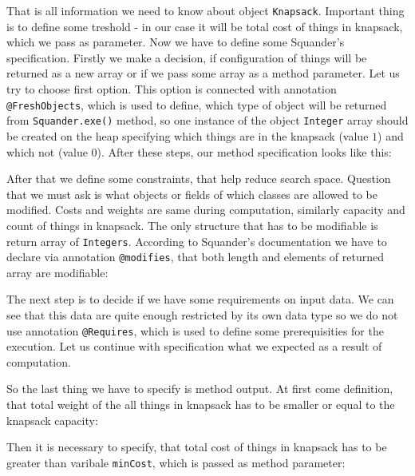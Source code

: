 \documentclass[11pt,twoside,a4paper]{book}
\begin{document}
That is all information we need to know about object \verb|Knapsack|. Important
thing is to define some treshold - in our case it will be total cost of things
in knapsack, which we pass as parameter. Now we have to define some Squander's
specification. Firstly we make a decision, if configuration of things will be returned as a new array or
if we pass some array as a method parameter. Let us try to choose first option.
This option is connected with annotation \verb|@FreshObjects|, which is used to
define, which type of object will be returned from \verb|Squander.exe()|
method, so one instance of the object \verb|Integer| array should be created on
the heap specifying which things are in the knapsack (value $1$) and which not
(value $0$). After these steps, our method specification looks like this:



After that we define some constraints, that help reduce search space. Question
that we must ask is what objects or fields of which classes are allowed to
be modified. Costs and weights are same during computation, similarly capacity
and count of things in knapsack. The only structure that has to be modifiable is
return array of \verb|Integers|. According to Squander's documentation we have
to declare via annotation \verb|@modifies|, that both length and elements of
returned array are modifiable:



The next step is to decide if we have some requirements on input data. We can
see that this data are quite enough restricted by its own data type so we do not
use annotation \verb|@Requires|, which is used to define some prerequisities for
the execution. Let us continue with specification what we expected as a result
of computation. 

So the last thing we have to specify is method output. At first come definition,
that total weight of the all things in knapsack has to be smaller or equal to
the knapsack capacity:



Then it is necessary to specify, that total cost of things in knapsack has to be
greater than varibale \verb|minCost|, which is passed as method parameter:
\end{document}
